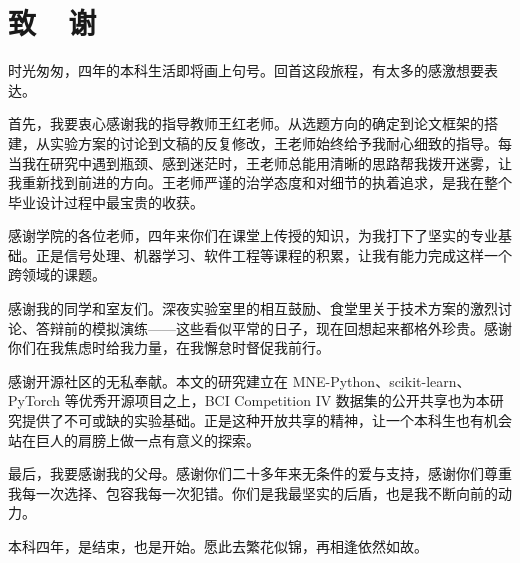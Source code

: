 \newpage
{}
{}
\section*{致~~谢}
\vspace*{-2mm}
\setlength{\baselineskip}{25pt}

时光匆匆，四年的本科生活即将画上句号。回首这段旅程，有太多的感激想要表达。

首先，我要衷心感谢我的指导教师王红老师。从选题方向的确定到论文框架的搭建，从实验方案的讨论到文稿的反复修改，王老师始终给予我耐心细致的指导。每当我在研究中遇到瓶颈、感到迷茫时，王老师总能用清晰的思路帮我拨开迷雾，让我重新找到前进的方向。王老师严谨的治学态度和对细节的执着追求，是我在整个毕业设计过程中最宝贵的收获。

感谢学院的各位老师，四年来你们在课堂上传授的知识，为我打下了坚实的专业基础。正是信号处理、机器学习、软件工程等课程的积累，让我有能力完成这样一个跨领域的课题。

感谢我的同学和室友们。深夜实验室里的相互鼓励、食堂里关于技术方案的激烈讨论、答辩前的模拟演练——这些看似平常的日子，现在回想起来都格外珍贵。感谢你们在我焦虑时给我力量，在我懈怠时督促我前行。

感谢开源社区的无私奉献。本文的研究建立在 MNE-Python、scikit-learn、PyTorch 等优秀开源项目之上，BCI Competition IV 数据集的公开共享也为本研究提供了不可或缺的实验基础。正是这种开放共享的精神，让一个本科生也有机会站在巨人的肩膀上做一点有意义的探索。

最后，我要感谢我的父母。感谢你们二十多年来无条件的爱与支持，感谢你们尊重我每一次选择、包容我每一次犯错。你们是我最坚实的后盾，也是我不断向前的动力。

本科四年，是结束，也是开始。愿此去繁花似锦，再相逢依然如故。






\label{thanks}  %



